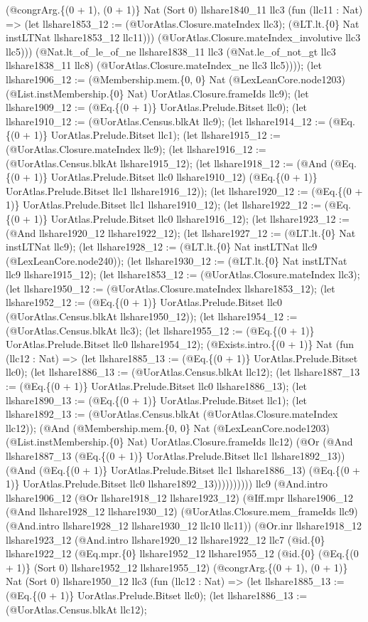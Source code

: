 \documentclass[11pt]{article}
\begin{document}
(@congrArg.\{(0 + 1), (0 + 1)\} Nat (Sort 0) llshare1840\_11 llc3 (fun (llc11 : Nat) => (let llshare1853\_12 := (@UorAtlas.Closure.mateIndex llc3); (@LT.lt.\{0\} Nat instLTNat llshare1853\_12 llc11))) (@UorAtlas.Closure.mateIndex\_involutive llc3 llc5))) (@Nat.lt\_of\_le\_of\_ne llshare1838\_11 llc3 (@Nat.le\_of\_not\_gt llc3 llshare1838\_11 llc8) (@UorAtlas.Closure.mateIndex\_ne llc3 llc5)))); (let llshare1906\_12 := (@Membership.mem.\{0, 0\} Nat (@LexLeanCore.node1203) (@List.instMembership.\{0\} Nat) UorAtlas.Closure.frameIds llc9); (let llshare1909\_12 := (@Eq.\{(0 + 1)\} UorAtlas.Prelude.Bitset llc0); (let llshare1910\_12 := (@UorAtlas.Census.blkAt llc9); (let llshare1914\_12 := (@Eq.\{(0 + 1)\} UorAtlas.Prelude.Bitset llc1); (let llshare1915\_12 := (@UorAtlas.Closure.mateIndex llc9); (let llshare1916\_12 := (@UorAtlas.Census.blkAt llshare1915\_12); (let llshare1918\_12 := (@And (@Eq.\{(0 + 1)\} UorAtlas.Prelude.Bitset llc0 llshare1910\_12) (@Eq.\{(0 + 1)\} UorAtlas.Prelude.Bitset llc1 llshare1916\_12)); (let llshare1920\_12 := (@Eq.\{(0 + 1)\} UorAtlas.Prelude.Bitset llc1 llshare1910\_12); (let llshare1922\_12 := (@Eq.\{(0 + 1)\} UorAtlas.Prelude.Bitset llc0 llshare1916\_12); (let llshare1923\_12 := (@And llshare1920\_12 llshare1922\_12); (let llshare1927\_12 := (@LT.lt.\{0\} Nat instLTNat llc9); (let llshare1928\_12 := (@LT.lt.\{0\} Nat instLTNat llc9 (@LexLeanCore.node240)); (let llshare1930\_12 := (@LT.lt.\{0\} Nat instLTNat llc9 llshare1915\_12); (let llshare1853\_12 := (@UorAtlas.Closure.mateIndex llc3); (let llshare1950\_12 := (@UorAtlas.Closure.mateIndex llshare1853\_12); (let llshare1952\_12 := (@Eq.\{(0 + 1)\} UorAtlas.Prelude.Bitset llc0 (@UorAtlas.Census.blkAt llshare1950\_12)); (let llshare1954\_12 := (@UorAtlas.Census.blkAt llc3); (let llshare1955\_12 := (@Eq.\{(0 + 1)\} UorAtlas.Prelude.Bitset llc0 llshare1954\_12); (@Exists.intro.\{(0 + 1)\} Nat (fun (llc12 : Nat) => (let llshare1885\_13 := (@Eq.\{(0 + 1)\} UorAtlas.Prelude.Bitset llc0); (let llshare1886\_13 := (@UorAtlas.Census.blkAt llc12); (let llshare1887\_13 := (@Eq.\{(0 + 1)\} UorAtlas.Prelude.Bitset llc0 llshare1886\_13); (let llshare1890\_13 := (@Eq.\{(0 + 1)\} UorAtlas.Prelude.Bitset llc1); (let llshare1892\_13 := (@UorAtlas.Census.blkAt (@UorAtlas.Closure.mateIndex llc12)); (@And (@Membership.mem.\{0, 0\} Nat (@LexLeanCore.node1203) (@List.instMembership.\{0\} Nat) UorAtlas.Closure.frameIds llc12) (@Or (@And llshare1887\_13 (@Eq.\{(0 + 1)\} UorAtlas.Prelude.Bitset llc1 llshare1892\_13)) (@And (@Eq.\{(0 + 1)\} UorAtlas.Prelude.Bitset llc1 llshare1886\_13) (@Eq.\{(0 + 1)\} UorAtlas.Prelude.Bitset llc0 llshare1892\_13)))))))))) llc9 (@And.intro llshare1906\_12 (@Or llshare1918\_12 llshare1923\_12) (@Iff.mpr llshare1906\_12 (@And llshare1928\_12 llshare1930\_12) (@UorAtlas.Closure.mem\_frameIds llc9) (@And.intro llshare1928\_12 llshare1930\_12 llc10 llc11)) (@Or.inr llshare1918\_12 llshare1923\_12 (@And.intro llshare1920\_12 llshare1922\_12 llc7 (@id.\{0\} llshare1922\_12 (@Eq.mpr.\{0\} llshare1952\_12 llshare1955\_12 (@id.\{0\} (@Eq.\{(0 + 1)\} (Sort 0) llshare1952\_12 llshare1955\_12) (@congrArg.\{(0 + 1), (0 + 1)\} Nat (Sort 0) llshare1950\_12 llc3 (fun (llc12 : Nat) => (let llshare1885\_13 := (@Eq.\{(0 + 1)\} UorAtlas.Prelude.Bitset llc0); (let llshare1886\_13 := (@UorAtlas.Census.blkAt llc12); 
\end{document}
